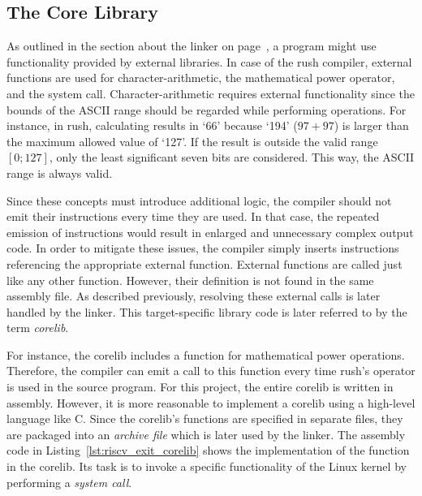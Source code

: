 \subsection{The Core Library}

As outlined in the section about the linker on page~\pageref{sec:linker},
a program might use functionality provided by external libraries.
In case of the rush \riscv{} compiler, external functions are used for character-arithmetic,
the mathematical power operator, and the  system call.
Character-arithmetic requires external functionality since the bounds of the ASCII range should be regarded while performing operations.
For instance, in rush, calculating \mbox{} results in `66' because `194' ($97 + 97$) is larger than the maximum allowed value of `127'.
If the result is outside the valid range $\left[0; 127\right]$, only the least significant seven bits are considered.
This way, the ASCII range is always valid.

Since these concepts must introduce additional logic, the compiler should not emit their instructions every time they are used.
In that case, the repeated emission of instructions would result in enlarged and unnecessary complex output code.
In order to mitigate these issues, the compiler simply inserts  instructions referencing the appropriate external function.
External functions are called just like any other function.
However, their definition is not found in the same assembly file.
As described previously, resolving these external calls is later handled by the linker.
This target-specific library code is later referred to by the term \emph{corelib}.

For instance, the corelib includes a function for mathematical power operations.
Therefore, the compiler can emit a call to this function every time rush's \qVerb{**} operator is used in the source program.
For this project, the entire corelib is written in \riscv{} assembly.
However, it is more reasonable to implement a corelib using a high-level language like C.
Since the corelib's functions are specified in separate files, they are packaged into an \emph{archive file} which is later used by the linker.
The assembly code in Listing~\ref{lst:riscv_exit_corelib} shows the implementation of the  function in the \riscv{} corelib.
Its task is to invoke a specific functionality of the Linux kernel by performing a \emph{system call}.


